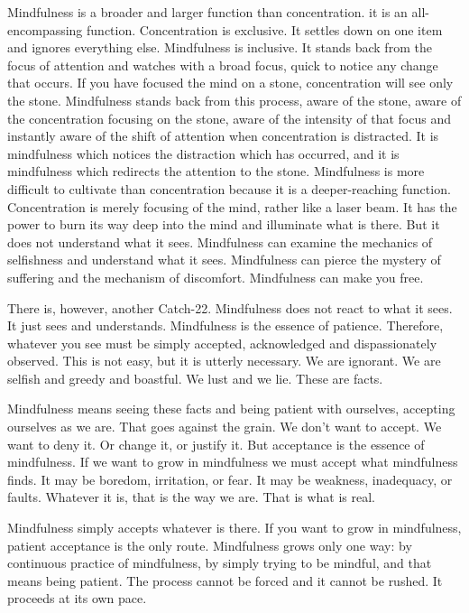 Mindfulness is a broader and larger function than concentration. it is an
all-encompassing function. Concentration is exclusive. It settles down on one
item and ignores everything else. Mindfulness is inclusive. It stands back from
the focus of attention and watches with a broad focus, quick to notice any
change that occurs. If you have focused the mind on a stone, concentration will
see only the stone. Mindfulness stands back from this process, aware of the
stone, aware of the concentration focusing on the stone, aware of the intensity
of that focus and instantly aware of the shift of attention when concentration
is distracted. It is mindfulness which notices the distraction which has
occurred, and it is mindfulness which redirects the attention to the stone.
Mindfulness is more difficult to cultivate than concentration because it is a
deeper-reaching function. Concentration is merely focusing of the mind, rather
like a laser beam. It has the power to burn its way deep into the mind and
illuminate what is there. But it does not understand what it sees. Mindfulness
can examine the mechanics of selfishness and understand what it sees.
Mindfulness can pierce the mystery of suffering and the mechanism of discomfort.
Mindfulness can make you free.

There is, however, another Catch-22. Mindfulness does not react to what it sees.
It just sees and understands. Mindfulness is the essence of patience. Therefore,
whatever you see must be simply accepted, acknowledged and dispassionately
observed. This is not easy, but it is utterly necessary. We are ignorant. We are
selfish and greedy and boastful. We lust and we lie. These are facts.

Mindfulness means seeing these facts and being patient with ourselves, accepting
ourselves as we are. That goes against the grain.
We don't want to accept. We want to deny it. Or change it, or justify it. But acceptance is the essence of mindfulness. If we want
to grow in mindfulness we must accept what mindfulness finds. It may be boredom, irritation, or fear. It may be weakness,
inadequacy, or faults. Whatever it is, that is the way we are. That is what is real.

Mindfulness simply accepts whatever is there. If you want to grow in
mindfulness, patient acceptance is the only route.
Mindfulness grows only one way: by continuous practice of mindfulness, by simply trying to be mindful, and that means being
patient. The process cannot be forced and it cannot be rushed. It proceeds at its own pace.

